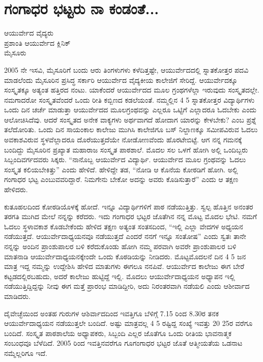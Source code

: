 {\fontsize{14}{16}\selectfont
\chapter{ಗಂಗಾಧರ ಭಟ್ಟರು ನಾ ಕಂಡಂತೆ...}

\begin{center}
\smallskip
ಆಯುರ್ವೇದ ವೈದ್ಯರು\\
ಪ್ರಶಾಂತಿ ಆಯುರ್ವೇದ ಕ್ಲಿನಿಕ್\\
ಮೈಸೂರು
\addrule
\end{center}
2005 ನೇ ಇಸವಿ, ಮೈಸೂರಿಗೆ ಬಂದು ಆರು ತಿಂಗಳುಗಳು ಕಳೆದಿತ್ತಷ್ಟೇ, ಆಯುರ್ವೇದದಲ್ಲಿ ಸ್ನಾತಕೋತ್ತರ ಪದವಿ ಮಾಡಲೆಂದು ಮೈಸೂರಿನ ಪ್ರಸಿದ್ಧ ಸರ್ಕಾರಿ ಆಯುರ್ವೇದ ವೈದ್ಯಕೀಯ ಕಾಲೇಜಿಗೆ ಸೇರಿದ್ದೆ. ಆಯುರ್ವೇದಕ್ಕೂ ಸಂಸ್ಕೃತಕ್ಕೂ ಅತ್ಯಂತ ಹತ್ತಿರದ ನಂಟು. ಯಾಕೆಂದರೆ ಆಯುರ್ವೇದದ ಮೂಲ ಗ್ರಂಥಗಳೆಲ್ಲಾ ಇರುವುದು ಸಂಸ್ಕೃತದಲ್ಲೇ. ನಮಗಾದರೋ ಸಂಸ್ಕೃತವೆಂದರೆ ಒಂದು ರೀತಿ ಕಬ್ಬಿಣದ ಕಡಲೆಯಂತೆ. ನಮ್ಮಲ್ಲಿನ 4  \enginline{-}  5 ಸ್ನಾತಕೋತ್ತರ ವಿದ್ಯಾರ್ಥಿಗಳು ಒಂದು ದಿನ ಚರ್ಚೆ ಮಾಡುತ್ತಾ ಆಯುರ್ವೇದದ ಮೂಲಗ್ರಂಥವನ್ನು ಎಲ್ಲರೂ ಒಟ್ಟಿಗೆ ಎಲ್ಲಾದರೂ ಓದಬೇಕು ಎಂದು ಆಲೋಚಿಸಿದೆವು. ಆದರೆ ಸಂಸ್ಕೃತದ ಅನೇಕ ವಾಕ್ಯಗಳು ಅರ್ಥವಾಗದೆ ಹೋದಾಗ ಯಾರನ್ನು ಕೇಳಬೇಕು? ಎಂಬ ಪ್ರಶ್ನೆ ತಲೆದೋರಿತು. ಒಂದು ದಿನ ಸಾಯಂಕಾಲ ಕಾಲೇಜು ಮುಗಿಸಿ ಕಾಲೇಜಿಗೂ ಬಸ್ ನಿಲ್ದಾಣಕ್ಕೂ ಸಮೀಪವಿರುವ ಓದಲು ಅವಕಾಶವಿರುವ ಸ್ಥಳವೆಲ್ಲಾದರೂ ದೊರೆಯುತ್ತದೆಯೇ ನೋಡೋಣವೆಂದು ಹೊರಟೇಬಿಟ್ಟೆ. ಆಗ ನನ್ನ ಗಮನಕ್ಕೆ ಬಂದಿದ್ದು ಮೈಸೂರಿನ ಪ್ರಖ್ಯಾತ ಮಹಾರಾಜ ಸಂಸ್ಕೃತ ಪಾಠಶಾಲೆ. ಮೊದಲ ಸಲ ಒಳಗೆ ಹೋಗಿ ಅಲ್ಲಿ ಒಂದಿಬ್ಬರು ಸಿಬ್ಬಂದಿವರ್ಗದವರು ಸಿಕ್ಕರು. “ನಾನೊಬ್ಬ ಆಯುರ್ವೇದ ವಿದ್ಯಾರ್ಥಿ. ಆಯುರ್ವೇದ ಮೂಲ ಗ್ರಂಥವನ್ನು ಓದಲು ಸಂಸ್ಕೃತ ಕಲಿಯಬೇಕಿತ್ತು” ಎಂದು ಹೇಳಿದೆ. ಹೇಳಿದ್ದೇ ತಡ,  “ನೋಡಿ ಆ ಕೊನೆಯ ಕೋಠಡಿಗೆ ಹೋಗಿ. ಅಲ್ಲಿ ಗಂಗಾಧರ ಭಟ್ಟ ಎಂಬುವವರಿದ್ದಾರೆ. ನಿಮಗೇನು ಬೇಕೋ ಅದನ್ನು ಅವರು ಕೊಡಿಸುತ್ತಾರೆ” ಎಂದು ಆ ತಕ್ಷಣ ಹೇಳಿದರು.

ಕುತೂಹಲದಿಂದ ಕೋಠಡಿಯೊಳಕ್ಕೆ ಹೋದೆ. ಇನ್ನೂ ವಿದ್ಯಾರ್ಥಿಗಳಿಗೆ ಪಾಠ ನಡೆಯುತ್ತಿತ್ತು. ಸ್ವಲ್ಪ ಹೊತ್ತಿನ  ಅನಂತರ ತರಗತಿ ಮುಗಿದ ಮೇಲೆ ನನ್ನನ್ನು ಕರೆದರು. ಇದು ಗಂಗಾಧರ ಭಟ್ಟರ ಜೊತೆಗಿನ ನನ್ನ ಮೊಟ್ಟ ಮೊದಲ ಭೇಟಿ. ನಮಗೆ ಓದಲು  ಸ್ಥಳಾವಕಾಶ ಕೊಡಬೇಕೆಂದು ಹೇಳಿದ ತಕ್ಷಣ ಅತ್ಯಂತ ಸಂತಸದಿಂದ, “ಇಲ್ಲಿ ಎಲ್ಲಾ ವೇದಗಳ ಅಧ್ಯಯನ ನಡೆಯುತ್ತದೆ. ಆಯುರ್ವೇದಾಧ್ಯಯನವೂ ನಡೆಯುತ್ತದೆ ಎಂದರೆ ನನಗೆ ಇನ್ನೂ ಸಂತೋಷ” ಎಂದು ಸ್ವತಃ ತಾನೇ ನನ್ನನ್ನು ಅಂದಿನ ಪ್ರಾಂಶುಪಾಲರ ಬಳಿ ಕರೆದುಕೊಂಡು ಹೋಗಿ ನಮ್ಮ ಪರವಾಗಿ ಅವರೇ ಪ್ರಾಂಶುಪಾಲರ ಬಳಿ ಮಾತನಾಡಿ ಆಯುರ್ವೇದಾಧ್ಯಯನಕ್ಕೇಂದೇ ಒಂದು ಕೊಠಡಿಯನ್ನು ನೀಡಿದರು. 
ಮೊಟ್ಟಮೊದಲನೆ ದಿನ 4  \enginline{-}  5 ಜನ ಮಾತ್ರ ಇದ್ದ ನಮ್ಮನ್ನು ಉದ್ದೇಶಿಸಿ ಹೇಳಿದ ಮಾತುಗಳು ಈಗಲೂ ನನಪಿವೆ. ಆಯುರ್ವೇದ ಕಾಲೇಜು ಈಗ ಬೇರೆ ಕಟ್ಟಡದಲ್ಲಿರಬಹುದು, ಅದರೆ ಕಾಲೇಜು ಹುಟ್ಟಿದ್ದೆ ಇಲ್ಲಿ. ಮೊದಲು ಆಯುರ್ವೇದಾಧ್ಯಯನ ಅಧ್ಯಾಪನ ಇಲ್ಲಿ ನಡೆಯುತ್ತಿದ್ದಿದ್ದನ್ನು ನೀವು ಈಗ ಮತ್ತೆ ಪ್ರಾರಂಭ ಮಾಡಿದ್ದೀರಿ, ಅದು ನಿರಂತರವಾಗಿ ನಡೆಯಲಿ ಎಂದು ಆಶೀರ್ವಾದ ಮಾಡಿದರು. 


ದೈವೇಚ್ಛೆಯಿಂದ ಅಂತಹ ಗುರುಗಳ ಆಶಿರ್ವಾದದಿಂದ ಇವತ್ತಿಗೂ ಬೆಳಿಗ್ಗೆ 7.15 ರಿಂದ 8.30ರ ತನಕ ಆಯುರ್ವೇದಾಧ್ಯಯನ ನಡೆಯುತ್ತಲೇ ಬಂದಿದೆ. ಅಷ್ಟು ಮಾತ್ರವಲ್ಲ 4  \enginline{-}  5 ರಷ್ಟಿದ್ದ ಸಂಖ್ಯೆ ಇವತ್ತು 20  \enginline{-}  25ರ ವರೆಗೂ ಬಂದಿದೆ. ಸಂಸ್ಕೃತ ಪಾಠಶಾಲೆಯ ಅಧ್ಯಾಪಕರು, ಸಿಬ್ಬಂದಿ ಎಲ್ಲರ ಜೊತೆಗೂ ಒಂದು ರೀತಿಯ ಭಾವನಾತ್ಮಕ ಸಂಬಂಧವೂ ಬೆಳೆದಿದೆ. 2005 ರಿಂದ ಇವತ್ತಿನವರೆಗೂ ಗೂಗಂಗಾಧರ ಭಟ್ಟರ ಜೊತೆ ಆತ್ಮೀಯತೆಯ ಒಡನಾಟ ನಮ್ಮೆಲ್ಲರಿಗೂ ಇದೆ.

}
